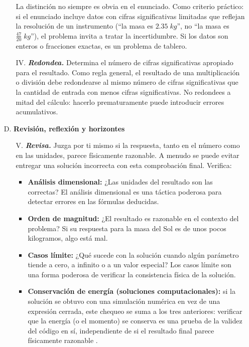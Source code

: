 \documentclass[11pt]{book}
\begin{document}
\begin{enumerate}
\begin{enumerate}
    La distinción no siempre es obvia en el enunciado. Como criterio práctico: si el enunciado incluye datos con cifras significativas limitadas que reflejan la resolución de un instrumento (``la masa es $2.35\;kg$'', no ``la masa es $\frac{47}{20}\;kg$''), el problema invita a tratar la incertidumbre. Si los datos son enteros o fracciones exactas, es un problema de tablero.

    \item[IV.] {\it\bf Redondea.} Determina el número de cifras significativas apropiado para el resultado. Como regla general, el resultado de una multiplicación o división debe redondearse al mismo número de cifras significativas que la cantidad de entrada con menos cifras significativas. No redondees a mitad del cálculo: hacerlo prematuramente puede introducir errores acumulativos.
\end{enumerate}


\item[D.] \textbf{Revisión, reflexión y horizontes}

\begin{enumerate}
    \item[V.] {\it\bf Revisa.} Juzga por ti mismo si la respuesta, tanto en el número como en las unidades, parece físicamente razonable. A menudo se puede evitar entregar una solución incorrecta con esta comprobación final. Verifica:
    \begin{itemize}
        \item {\bf Análisis dimensional:} ¿Las unidades del resultado son las correctas? El análisis dimensional es una táctica poderosa para detectar errores en las fórmulas deducidas.
        \item {\bf Orden de magnitud:} ¿El resultado es razonable en el contexto del problema? Si su respuesta para la masa del Sol es de unos pocos kilogramos, algo está mal.
        \item {\bf Casos límite:} ¿Qué sucede con la solución cuando algún parámetro tiende a cero, a infinito o a un valor especial? Los casos límite son una forma poderosa de verificar la consistencia física de la solución.
        \item {\bf Conservación de energía (soluciones computacionales):} si la solución se obtuvo con una simulación numérica en vez de una expresión cerrada, este chequeo se suma a los tres anteriores: verificar que la energía (o el momento) se conserva es una prueba de la validez del código en sí, independiente de si el resultado final parece físicamente razonable \cite{MaltheSorenssen2015}.
    \end{itemize}


\end{enumerate}
\end{enumerate}
\end{document}
